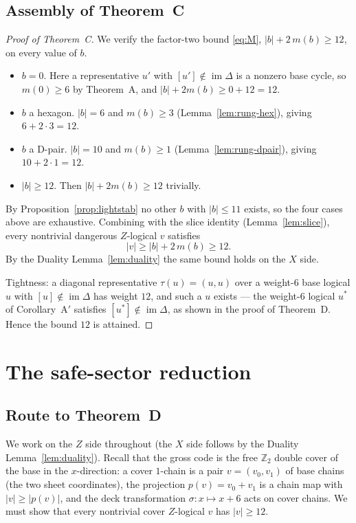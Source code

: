 \documentclass[11pt]{article}
\newcommand{\Z}{\mathbb{Z}}
\newcommand{\wt}[1]{\lvert #1\rvert}
\DeclareMathOperator{\img}{im}
\newcommand{\cmap}{\Delta}                       %
\theoremstyle{plain}
\theoremstyle{definition}
\theoremstyle{remark}
\begin{document}
\subsection{Assembly of Theorem~C}\label{subsec:assembly}

\begin{proof}[Proof of Theorem~C]
We verify the factor-two bound \eqref{eq:M}, $\wt b+2\,m(b)\ge 12$, on every value of $b$.

\begin{itemize}
\item $b=0$. Here a representative $u'$ with $[u']\notin\img\cmap$ is a nonzero base
  cycle, so $m(0)\ge 6$ by Theorem~A, and $\wt b+2m(b)\ge 0+12=12$.
\item $b$ a hexagon. $\wt b=6$ and $m(b)\ge 3$ (Lemma~\ref{lem:rung-hex}), giving
  $6+2\cdot 3=12$.
\item $b$ a D-pair. $\wt b=10$ and $m(b)\ge 1$ (Lemma~\ref{lem:rung-dpair}), giving
  $10+2\cdot 1=12$.
\item $\wt b\ge 12$. Then $\wt b+2m(b)\ge 12$ trivially.
\end{itemize}
By Proposition~\ref{prop:lightstab} no other $b$ with $\wt b\le 11$ exists, so the four
cases above are exhaustive. Combining with the slice identity (Lemma~\ref{lem:slice}),
every nontrivial dangerous $Z$-logical $v$ satisfies
\[
  \wt v\ge\wt b+2\,m(b)\ge 12.
\]
By the Duality Lemma~\ref{lem:duality} the same bound holds on the $X$ side.

Tightness: a diagonal representative $\tau(u)=(u,u)$ over a weight-$6$ base logical $u$
with $[u]\notin\img\cmap$ has weight $12$, and such a $u$ exists --- the weight-$6$ logical
$u^\ast$ of Corollary~A$'$ satisfies $[u^\ast]\notin\img\cmap$, as shown in the proof of
Theorem~D. Hence the bound $12$ is attained.
\end{proof}
\section{The safe-sector reduction}\label{sec:safesector}

\subsection*{Route to Theorem~D}

We work on the $Z$ side throughout (the $X$ side follows by the Duality
Lemma~\ref{lem:duality}). Recall that the gross code is the free $\Z_2$ double
cover of the base in the $x$-direction: a cover $1$-chain is a pair $v=(v_0,v_1)$
of base chains (the two sheet coordinates), the projection $p(v)=v_0+v_1$ is a
chain map with $\wt v\ge\wt{p(v)}$, and the deck transformation
$\sigma\colon x\mapsto x+6$ acts on cover chains. We must show that every
nontrivial cover $Z$-logical $v$ has $\wt v\ge 12$.
\end{document}
